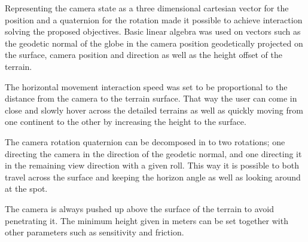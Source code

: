 Representing the camera state as a three dimensional cartesian vector for the position and a quaternion for the rotation made it possible to achieve interaction solving the proposed objectives. Basic linear algebra was used on vectors such as the geodetic normal of the globe in the camera position geodetically projected on the surface, camera position and direction as well as the height offset of the terrain.

The horizontal movement interaction speed was set to be proportional to the distance from the camera to the terrain surface. That way the user can come in close and slowly hover across the detailed terrains as well as quickly moving from one continent to the other by increasing the height to the surface.

The camera rotation quaternion can be decomposed in to two rotations; one directing the camera in the direction of the geodetic normal, and one directing it in the remaining view direction with a given roll. This way it is possible to both travel across the surface and keeping the horizon angle as well as looking around at the spot.

The camera is always pushed up above the surface of the terrain to avoid penetrating it. The minimum height given in meters can be set together with other parameters such as sensitivity and friction.
